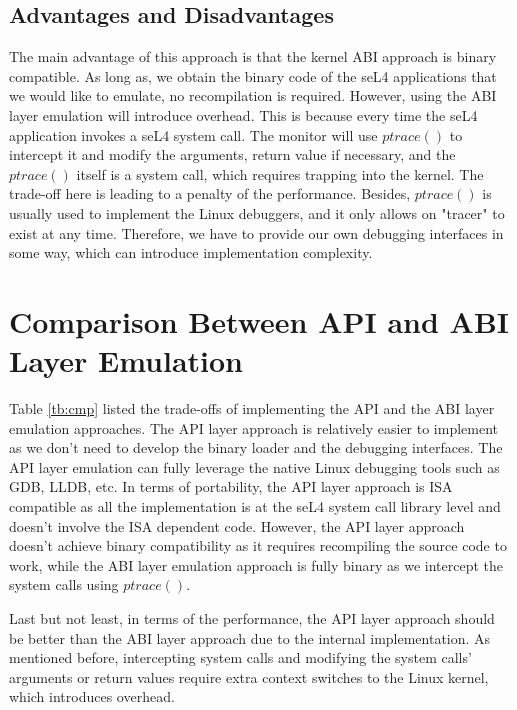 \subsection{Advantages and Disadvantages}
The main advantage of this approach is that the kernel ABI approach is binary compatible. As long as, we obtain the binary code of the seL4 applications that we would like to emulate, no recompilation is required. However, using the ABI layer emulation will introduce overhead. This is because every time the seL4 application invokes a seL4 system call. The monitor will use $ptrace()$ to intercept it and modify the arguments, return value if necessary, and the $ptrace()$ itself is a system call, which requires trapping into the kernel. The trade-off here is leading to a penalty of the performance. Besides, $ptrace()$ is usually used to implement the Linux debuggers, and it only allows on "tracer" to exist at any time. Therefore, we have to provide our own debugging interfaces in some way, which can introduce implementation complexity.  

\section{Comparison Between API and ABI Layer Emulation}

Table \ref{tb:cmp} listed the trade-offs of implementing the API and the ABI layer emulation approaches. The API layer approach is relatively easier to implement as we don't need to develop the binary loader and the debugging interfaces. The API layer emulation can fully leverage the native Linux debugging tools such as GDB, LLDB, etc. In terms of portability, the API layer approach is ISA compatible as all the implementation is at the seL4 system call library level and doesn't involve the ISA dependent code. However, the API layer approach doesn't achieve binary compatibility as it requires recompiling the source code to work, while the ABI layer emulation approach is fully binary as we intercept the system calls using $ptrace()$.

Last but not least, in terms of the performance, the API layer approach should be better than the ABI layer approach due to the internal implementation. As mentioned before, intercepting system calls and modifying the system calls' arguments or return values require extra context switches to the Linux kernel, which introduces overhead.

